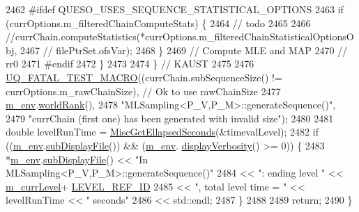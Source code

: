 \begin{DoxyCode}
2462 \textcolor{preprocessor}{#ifdef QUESO\_USES\_SEQUENCE\_STATISTICAL\_OPTIONS}
2463 \textcolor{preprocessor}{}        \textcolor{keywordflow}{if} (currOptions.m\_filteredChainComputeStats) \{
2464           \textcolor{comment}{// todo}
2465 
2466           \textcolor{comment}{//currChain.computeStatistics(*currOptions.m\_filteredChainStatisticalOptionsObj,}
2467           \textcolor{comment}{//                            filePtrSet.ofsVar);}
2468         \}
2469         \textcolor{comment}{// Compute MLE and MAP}
2470         \textcolor{comment}{// rr0}
2471 \textcolor{preprocessor}{#endif}
2472 \textcolor{preprocessor}{}      \}
2473 
2474     \} \textcolor{comment}{// KAUST}
2475 
2476     \hyperlink{_defines_8h_a56d63d18d0a6d45757de47fcc06f574d}{UQ\_FATAL\_TEST\_MACRO}((currChain.subSequenceSize() != currOptions.m\_rawChainSize), \textcolor{comment}{//
       Ok to use rawChainSize}
2477                         \hyperlink{class_q_u_e_s_o_1_1_m_l_sampling_a13f1ca4fe9f94822fe572a743eaced1d}{m\_env}.\hyperlink{class_q_u_e_s_o_1_1_base_environment_a78b57112bbd0e6dd0e8afec00b40ffa7}{worldRank}(),
2478                         \textcolor{stringliteral}{"MLSampling<P\_V,P\_M>::generateSequence()"},
2479                         \textcolor{stringliteral}{"currChain (first one) has been generated with invalid size"});
2480 
2481     \textcolor{keywordtype}{double} levelRunTime = \hyperlink{namespace_q_u_e_s_o_a424bc33f2e6e287fd468408d14b772ee}{MiscGetEllapsedSeconds}(&timevalLevel);
2482     \textcolor{keywordflow}{if} ((\hyperlink{class_q_u_e_s_o_1_1_m_l_sampling_a13f1ca4fe9f94822fe572a743eaced1d}{m\_env}.\hyperlink{class_q_u_e_s_o_1_1_base_environment_a8a0064746ae8dddfece4229b9ad374d6}{subDisplayFile}()) && (\hyperlink{class_q_u_e_s_o_1_1_m_l_sampling_a13f1ca4fe9f94822fe572a743eaced1d}{m\_env}.
      \hyperlink{class_q_u_e_s_o_1_1_base_environment_a1fe5f244fc0316a0ab3e37463f108b96}{displayVerbosity}() >= 0)) \{
2483       *\hyperlink{class_q_u_e_s_o_1_1_m_l_sampling_a13f1ca4fe9f94822fe572a743eaced1d}{m\_env}.\hyperlink{class_q_u_e_s_o_1_1_base_environment_a8a0064746ae8dddfece4229b9ad374d6}{subDisplayFile}() << \textcolor{stringliteral}{"In MLSampling<P\_V,P\_M>::generateSequence()"}
2484                               << \textcolor{stringliteral}{": ending level "} << \hyperlink{class_q_u_e_s_o_1_1_m_l_sampling_af9416874c856e50f3b35270e801f17e4}{m\_currLevel}+
      \hyperlink{_m_l_sampling_level_options_8h_a68d15eaf394d210effcf584b938206d3}{LEVEL\_REF\_ID}
2485                               << \textcolor{stringliteral}{", total level time = "} << levelRunTime << \textcolor{stringliteral}{" seconds"}
2486                               << std::endl;
2487     \}
2488 
2489   \textcolor{keywordflow}{return};
2490 \}
\end{DoxyCode}
